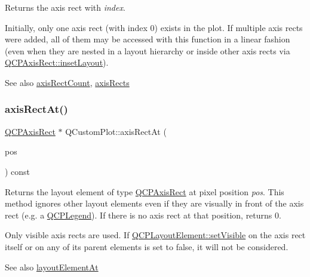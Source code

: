 Returns the axis rect with {\itshape index}.

Initially, only one axis rect (with index 0) exists in the plot. If multiple axis rects were added, all of them may be accessed with this function in a linear fashion (even when they are nested in a layout hierarchy or inside other axis rects via \hyperlink{class_q_c_p_axis_rect_a949f803466619924c7018df4b511ae10}{Q\+C\+P\+Axis\+Rect\+::inset\+Layout}).

\begin{DoxySeeAlso}{See also}
\hyperlink{class_q_custom_plot_a8f85940aaac50efb466287d9d2d04ec6}{axis\+Rect\+Count}, \hyperlink{class_q_custom_plot_a12af771429e2d7e313c8c5d5fca068fe}{axis\+Rects} 
\end{DoxySeeAlso}
\mbox{\label{class_q_custom_plot_a4a08842fc3e9ba6bed83aa410c5c5ba5}} 
\subsubsection{\texorpdfstring{axis\+Rect\+At()}{axisRectAt()}}
{\footnotesize\ttfamily \hyperlink{class_q_c_p_axis_rect}{Q\+C\+P\+Axis\+Rect} $\ast$ Q\+Custom\+Plot\+::axis\+Rect\+At (\begin{DoxyParamCaption}\item[{const Q\+PointF \&}]{pos }\end{DoxyParamCaption}) const}

Returns the layout element of type \hyperlink{class_q_c_p_axis_rect}{Q\+C\+P\+Axis\+Rect} at pixel position {\itshape pos}. This method ignores other layout elements even if they are visually in front of the axis rect (e.\+g. a \hyperlink{class_q_c_p_legend}{Q\+C\+P\+Legend}). If there is no axis rect at that position, returns 0.

Only visible axis rects are used. If \hyperlink{class_q_c_p_layerable_a3bed99ddc396b48ce3ebfdc0418744f8}{Q\+C\+P\+Layout\+Element\+::set\+Visible} on the axis rect itself or on any of its parent elements is set to false, it will not be considered.

\begin{DoxySeeAlso}{See also}
\hyperlink{class_q_custom_plot_afaa1d304e0287d140fd238e90889ef3c}{layout\+Element\+At} 
\end{DoxySeeAlso}
\mbox{\label{class_q_custom_plot_a8f85940aaac50efb466287d9d2d04ec6}} 
